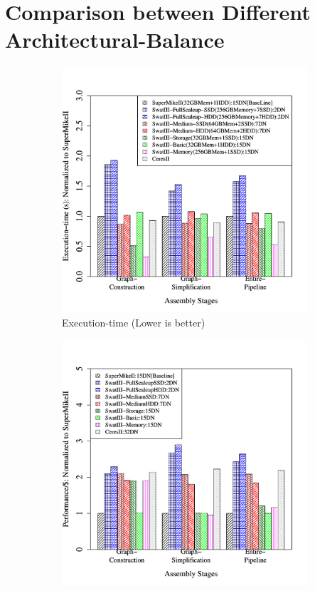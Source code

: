 \documentclass[conference]{IEEEtran}
\begin{document}
\section {Comparison between Different Architectural-Balance} \label{ComparingDifferentArchitecturalBalance}
\begin{figure}[htb]
        \begin{subfigure}[b]{0.5\textwidth}
                \includegraphics[width=\textwidth, height=.3\textheight]{Figure/PerormanceData/Plots/PerfDiffArch.pdf}
                \caption{Execution-time (Lower is better)}
                \label{fig:DifferentArchitecturesPerf}
        \end{subfigure}
        \begin{subfigure}[b]{0.5\textwidth}
                \includegraphics[width=\textwidth, height=.3\textheight]{Figure/PerormanceData/Plots/PerfPerDollarDiffArch.pdf}

\end{subfigure}
\end{figure}
\end{document}

